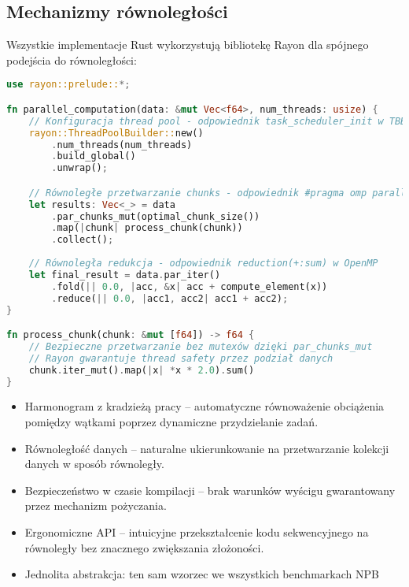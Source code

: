 \subsection{Mechanizmy równoległości}
Wszystkie implementacje Rust wykorzystują bibliotekę Rayon dla spójnego podejścia do równoległości:
\begin{lstlisting}[language=Rust, caption={Równoległość w benchmarkach NPB w języku Rust}, label={lst:rust_parallelism}]
use rayon::prelude::*;

fn parallel_computation(data: &mut Vec<f64>, num_threads: usize) {
    // Konfiguracja thread pool - odpowiednik task_scheduler_init w TBB
    rayon::ThreadPoolBuilder::new()
        .num_threads(num_threads)
        .build_global()
        .unwrap();

    // Równoległe przetwarzanie chunks - odpowiednik #pragma omp parallel for
    let results: Vec<_> = data
        .par_chunks_mut(optimal_chunk_size())
        .map(|chunk| process_chunk(chunk))
        .collect();
        
    // Równoległa redukcja - odpowiednik reduction(+:sum) w OpenMP
    let final_result = data.par_iter()
        .fold(|| 0.0, |acc, &x| acc + compute_element(x))
        .reduce(|| 0.0, |acc1, acc2| acc1 + acc2);
}

fn process_chunk(chunk: &mut [f64]) -> f64 {
    // Bezpieczne przetwarzanie bez mutexów dzięki par_chunks_mut
    // Rayon gwarantuje thread safety przez podział danych
    chunk.iter_mut().map(|x| *x * 2.0).sum()
}
\end{lstlisting}
\begin{itemize}
    \item Harmonogram z kradzieżą pracy  – automatyczne równoważenie obciążenia pomiędzy wątkami poprzez dynamiczne przydzielanie zadań.
    
    \item Równoległość danych – naturalne ukierunkowanie na przetwarzanie kolekcji danych w sposób równoległy.
    
    \item Bezpieczeństwo w czasie kompilacji – brak warunków wyścigu  gwarantowany przez mechanizm pożyczania.
    
    \item Ergonomiczne API – intuicyjne przekształcenie kodu sekwencyjnego na równoległy bez znacznego zwiększania złożoności.
    
    \item Jednolita abstrakcja: ten sam wzorzec we wszystkich benchmarkach NPB
  \end{itemize}
  

